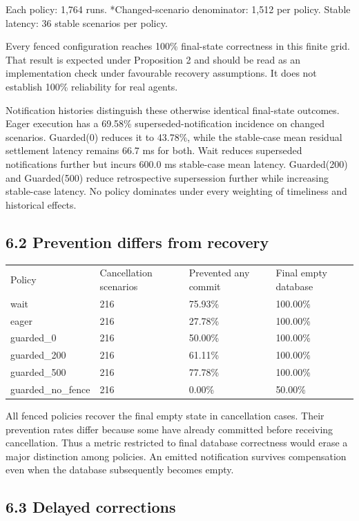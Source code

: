 \documentclass[10pt]{article}
\begin{document}
Each policy: 1,764 runs. *Changed-scenario denominator: 1,512 per policy. Stable latency: 36 stable scenarios per policy.


Every fenced configuration reaches 100\% final-state correctness in this finite grid. That result is expected under Proposition 2 and should be read as an implementation check under favourable recovery assumptions. It does not establish 100\% reliability for real agents.


Notification histories distinguish these otherwise identical final-state outcomes. Eager execution has a 69.58\% superseded-notification incidence on changed scenarios. Guarded(0) reduces it to 43.78\%, while the stable-case mean residual settlement latency remains 66.7 ms for both. Wait reduces superseded notifications further but incurs 600.0 ms stable-case mean latency. Guarded(200) and Guarded(500) reduce retrospective supersession further while increasing stable-case latency. No policy dominates under every weighting of timeliness and historical effects.


\subsection*{6.2 Prevention differs from recovery}

{\scriptsize
\begin{tabularx}{\textwidth}{XXXX}
\hline
Policy & Cancellation scenarios & Prevented any commit & Final empty database \\
wait & 216 & 75.93\% & 100.00\% \\
eager & 216 & 27.78\% & 100.00\% \\
guarded\_0 & 216 & 50.00\% & 100.00\% \\
guarded\_200 & 216 & 61.11\% & 100.00\% \\
guarded\_500 & 216 & 77.78\% & 100.00\% \\
guarded\_no\_fence & 216 & 0.00\% & 50.00\% \\
\hline
\end{tabularx}
}


All fenced policies recover the final empty state in cancellation cases. Their prevention rates differ because some have already committed before receiving cancellation. Thus a metric restricted to final database correctness would erase a major distinction among policies. An emitted notification survives compensation even when the database subsequently becomes empty.


\subsection*{6.3 Delayed corrections}
\end{document}
